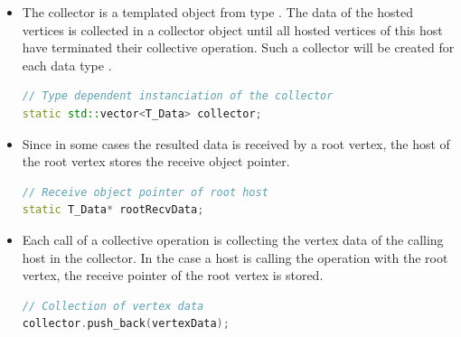 \begin{itemize}
\item []
  The collector is a templated  object from type
  .  The data of the hosted vertices is
  collected in a collector object until all hosted vertices of this
  host have terminated their collective operation. Such a collector
  will be created for each data type .

  \begin{minipage}[t]{\textwidth} 
  \begin{lstlisting}[language=C++, label=lst:static_collective]
// Type dependent instanciation of the collector
static std::vector<T_Data> collector;
  \end{lstlisting}
  \end{minipage}

\item [] Since in some cases the resulted data is received by a root vertex, the host of
the root vertex stores the receive object pointer.

\begin{minipage}[t]{\textwidth} 
\begin{lstlisting}[language=C++, label=lst:root]
// Receive object pointer of root host
static T_Data* rootRecvData;
\end{lstlisting}
\end{minipage}


\item [] Each call of a collective operation is collecting the vertex
  data of the calling host in the collector.  In the case a host is
  calling the operation with the root vertex, the receive pointer of
  the root vertex is stored.

  
\begin{minipage}[t]{\textwidth}
  \begin{lstlisting}[language=C++, label=lst:collecting]
// Collection of vertex data
collector.push_back(vertexData);
  \end{lstlisting}
  \end{minipage}

\end{itemize}


